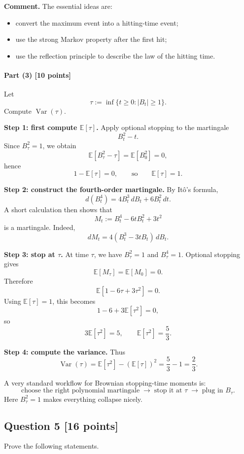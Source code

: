 \documentclass[11pt]{article}
\theoremstyle{definition}
\begin{document}
\textbf{Comment.}
The essential ideas are:
\begin{itemize}[leftmargin=2em]
    \item convert the maximum event into a hitting-time event;
    \item use the strong Markov property after the first hit;
    \item use the reflection principle to describe the law of the hitting time.
\end{itemize}

\paragraph{Part (3) \hfill [10 points]}
Let
\[
\tau:=\inf\{t\ge 0:|B_t|\ge 1\}.
\]
Compute \(\operatorname{Var}(\tau)\).

\textbf{Step 1: first compute \(\mathbb E[\tau]\).}
Apply optional stopping to the martingale
\[
B_t^2-t.
\]
Since \(B_\tau^2=1\), we obtain
\[
\mathbb E[B_\tau^2-\tau]=\mathbb E[B_0^2]=0,
\]
hence
\[
1-\mathbb E[\tau]=0,
\qquad\text{so}\qquad
\mathbb E[\tau]=1.
\]

\textbf{Step 2: construct the fourth-order martingale.}
By It\^o's formula,
\[
d(B_t^4)=4B_t^3\,dB_t+6B_t^2\,dt.
\]
A short calculation then shows that
\[
M_t:=B_t^4-6tB_t^2+3t^2
\]
is a martingale. Indeed,
\[
dM_t
=
4(B_t^3-3tB_t)\,dB_t.
\]

\textbf{Step 3: stop at \(\tau\).}
At time \(\tau\), we have \(B_\tau^2=1\) and \(B_\tau^4=1\). Optional stopping gives
\[
\mathbb E[M_\tau]=\mathbb E[M_0]=0.
\]
Therefore
\[
\mathbb E\!\left[1-6\tau+3\tau^2\right]=0.
\]
Using \(\mathbb E[\tau]=1\), this becomes
\[
1-6+3\mathbb E[\tau^2]=0,
\]
so
\[
3\mathbb E[\tau^2]=5,
\qquad
\mathbb E[\tau^2]=\frac53.
\]

\textbf{Step 4: compute the variance.}
Thus
\[
\operatorname{Var}(\tau)
=
\mathbb E[\tau^2]-(\mathbb E[\tau])^2
=
\frac53-1
=
\boxed{\frac23.}
\]

\begin{summarybox}
A very standard workflow for Brownian stopping-time moments is:
\[
\text{choose the right polynomial martingale} \;\longrightarrow\; \text{stop it at } \tau \;\longrightarrow\; \text{plug in } B_\tau.
\]
Here \(B_\tau^2=1\) makes everything collapse nicely.
\end{summarybox}

\subsection*{Question 5 \hfill [16 points]}
Prove the following statements.
\end{document}
